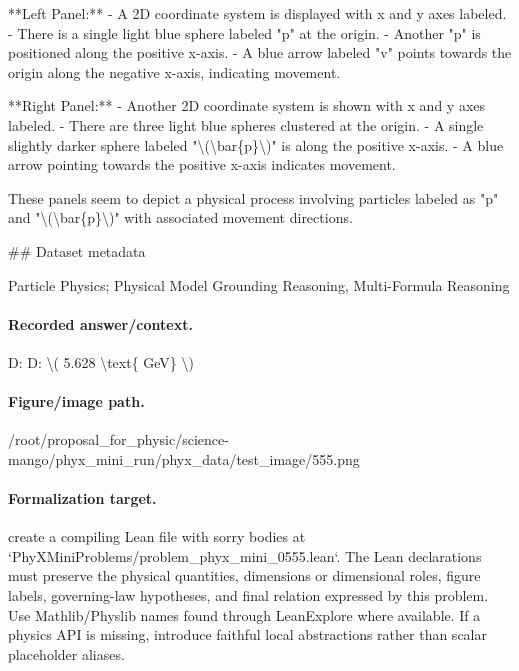 **Left Panel:**
- A 2D coordinate system is displayed with x and y axes labeled.
- There is a single light blue sphere labeled "p" at the origin.
- Another "p" is positioned along the positive x-axis.
- A blue arrow labeled "v" points towards the origin along the negative x-axis, indicating movement.

**Right Panel:**
- Another 2D coordinate system is shown with x and y axes labeled.
- There are three light blue spheres clustered at the origin.
- A single slightly darker sphere labeled "\textbackslash{}(\textbackslash{}bar\{p\}\textbackslash{})" is along the positive x-axis.
- A blue arrow pointing towards the positive x-axis indicates movement.

These panels seem to depict a physical process involving particles labeled as "p" and "\textbackslash{}(\textbackslash{}bar\{p\}\textbackslash{})" with associated movement directions.

\#\# Dataset metadata

Particle Physics; Physical Model Grounding Reasoning, Multi-Formula Reasoning

\paragraph{Recorded answer/context.}
D: D: \textbackslash{}( 5.628 \textbackslash{}text\{ GeV\} \textbackslash{})

\paragraph{Figure/image path.}
/root/proposal\_for\_physic/science-mango/phyx\_mini\_run/phyx\_data/test\_image/555.png

\paragraph{Formalization target.}
create a compiling Lean file with sorry bodies at `PhyXMiniProblems/problem\_phyx\_mini\_0555.lean`. The Lean declarations must preserve the physical quantities, dimensions or dimensional roles, figure labels, governing-law hypotheses, and final relation expressed by this problem.
Use Mathlib/Physlib names found through LeanExplore where available. If a physics API is missing, introduce faithful local abstractions rather than scalar placeholder aliases.

